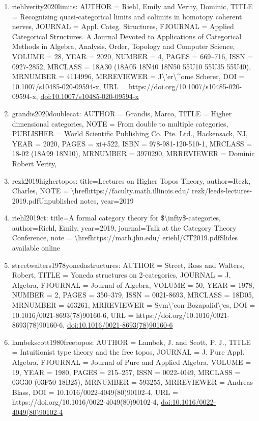 \documentclass[11pt]{article}
\begin{document}
\begin{enumerate}[leftmargin=*]
  \item riehlverity2020limits: AUTHOR = Riehl, Emily and Verity, Dominic, TITLE = Recognizing quasi-categorical limits and colimits in homotopy coherent nerves, JOURNAL = Appl. Categ. Structures, FJOURNAL = Applied Categorical Structures. A Journal Devoted to Applications of Categorical Methods in Algebra, Analysis, Order, Topology and Computer Science, VOLUME = 28, YEAR = 2020, NUMBER = 4, PAGES = 669--716, ISSN = 0927-2852, MRCLASS = 18A30 (18A05 18N40 18N50 55U10 55U35 55U40), MRNUMBER = 4114996, MRREVIEWER = J\textbackslash{}'er\textbackslash{}\^{}ome Scherer, DOI = 10.1007/s10485-020-09594-x, URL = https://doi.org/10.1007/s10485-020-09594-x, \href{https://doi.org/10.1007/s10485-020-09594-x}{doi:10.1007/s10485-020-09594-x}
  \item grandis2020doublecat: AUTHOR = Grandis, Marco, TITLE = Higher dimensional categories, NOTE = From double to multiple categories, PUBLISHER = World Scientific Publishing Co. Pte. Ltd., Hackensack, NJ, YEAR = 2020, PAGES = xi+522, ISBN = 978-981-120-510-1, MRCLASS = 18-02 (18A99 18N10), MRNUMBER = 3970290, MRREVIEWER = Dominic Robert Verity,
  \item rezk2019highertopos: title=Lectures on Higher Topos Theory, author=Rezk, Charles, NOTE = \textbackslash{}hrefhttps://faculty.math.illinois.edu/ rezk/leeds-lectures-2019.pdfUnpublished notes, year=2019
  \item riehl2019ct: title=A formal category theory for \$\textbackslash{}infty\$-categories, author=Riehl, Emily, year=2019, journal=Talk at the Category Theory Conference, note = \textbackslash{}hrefhttps://math.jhu.edu/ eriehl/CT2019.pdfSlides available online
  \item streetwalters1978yonedastructures: AUTHOR = Street, Ross and Walters, Robert, TITLE = Yoneda structures on 2-categories, JOURNAL = J. Algebra, FJOURNAL = Journal of Algebra, VOLUME = 50, YEAR = 1978, NUMBER = 2, PAGES = 350--379, ISSN = 0021-8693, MRCLASS = 18D05, MRNUMBER = 463261, MRREVIEWER = Sym\textbackslash{}'eon Bozapalid\textbackslash{}`es, DOI = 10.1016/0021-8693(78)90160-6, URL = https://doi.org/10.1016/0021-8693(78)90160-6, \href{https://doi.org/10.1016/0021-8693(78)90160-6}{doi:10.1016/0021-8693(78)90160-6}
  \item lambekscott1980freetopos: AUTHOR = Lambek, J. and Scott, P. J., TITLE = Intuitionist type theory and the free topos, JOURNAL = J. Pure Appl. Algebra, FJOURNAL = Journal of Pure and Applied Algebra, VOLUME = 19, YEAR = 1980, PAGES = 215--257, ISSN = 0022-4049, MRCLASS = 03G30 (03F50 18B25), MRNUMBER = 593255, MRREVIEWER = Andreas Blass, DOI = 10.1016/0022-4049(80)90102-4, URL = https://doi.org/10.1016/0022-4049(80)90102-4, \href{https://doi.org/10.1016/0022-4049(80)90102-4}{doi:10.1016/0022-4049(80)90102-4}

\end{enumerate}
\end{document}
